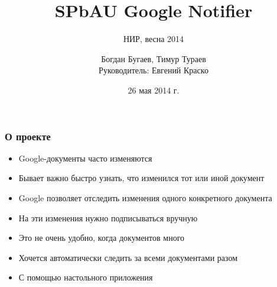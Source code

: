 \documentclass[10pt,pdf,hyperref={unicode}]{beamer}
\begin{document}
    \title[GoogleNotifier]{SPbAU Google Notifier}
    \subtitle{НИР, весна 2014}
    \author{Богдан Бугаев, Тимур Тураев \\ Руководитель: Евгений Краско}
    \date{26 мая 2014 г.}
    

    \begin{frame}
		\titlepage
	\end{frame}
    
    \begin{frame}\frametitle{О проекте}
        \begin{itemize}
        	\item	Google-документы часто изменяются
	       	\item	Бывает важно быстро узнать, что изменился тот или иной документ
	       	\pause
            \item	Google позволяет отследить изменения одного конкретного документа
            \pause
            \item	На эти изменения нужно подписываться вручную
            \pause            
            \item	Это не очень удобно, когда документов много
            \pause            
            \item	Хочется автоматически следить за всеми документами разом
            \pause            
            \item	С помощью настольного приложения
        \end{itemize}
    \end{frame}
    
\end{document}
